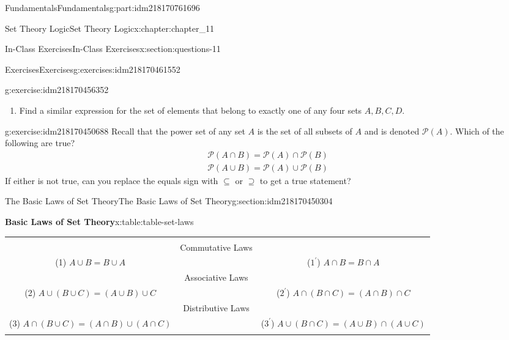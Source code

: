 \documentclass[oneside,10pt,]{book}
\newcommand{\tabularfont}{\relax}
\numberwithin{equation}{section}
\newcommand{\hrulethin}  {\noalign{\hrule height 0.04em}}
\begin{document}
\begin{partptx}{Fundamentals}{}{Fundamentals}{}{}{g:part:idm218170761696}
\begin{chapterptx}{Set Theory Logic}{}{Set Theory Logic}{}{}{x:chapter:chapter_11}
\begin{sectionptx}{In-Class Exercises}{}{In-Class Exercises}{}{}{x:section:questions-11}
\begin{exercises-subsection-numberless}{Exercises}{}{Exercises}{}{}{g:exercises:idm218170461552}
\begin{exercisegroup}
\begin{divisionexerciseeg}{2}{}{}{g:exercise:idm218170456352}
\begin{enumerate}[label=(\alph*)]
\begin{equation*}
(A \cup B \cup C)\cap ((A^c \cap B^c)\cup (A^c \cap C^c)\cup (B^c \cap C^c))
\end{equation*}
is the set of all elements that belong to exactly one of the three sets.  Verify this fact first with the example in the previous part, where you assume that the universe is \(\{1,2,3,\dots,18,19\}\).%
\item{}Find a similar expression for the set of elements that belong to exactly one of any four sets \(A, B, C, D.\)%
\end{enumerate}
%
\end{divisionexerciseeg}%
\begin{divisionexerciseeg}{3}{}{}{g:exercise:idm218170450688}%
Recall that the power set of any set \(A\) is the set of all subsets of \(A\) and is denoted \(\mathcal{P}(A)\).  Which of the following are true?%
\begin{gather*}
\mathcal{P}(A \cap B) = \mathcal{P}(A) \cap \mathcal{P}(B)\\
\mathcal{P}(A \cup B) = \mathcal{P}(A) \cup \mathcal{P}(B)
\end{gather*}
If either is not true, can you replace the equals sign with \(\subseteq\) or \(\supseteq\) to get a true statement?%
\end{divisionexerciseeg}%
\end{exercisegroup}
\par\medskip\noindent
\end{exercises-subsection-numberless}
\end{sectionptx}
%
%
\typeout{************************************************}
\typeout{************************************************}
%
\begin{sectionptx}{The Basic Laws of Set Theory}{}{The Basic Laws of Set Theory}{}{}{g:section:idm218170450304}
\begin{tableptx}{\textbf{Basic Laws of Set Theory}}{x:table:table-set-laws}{}%
\centering%
{\tabularfont%
\begin{tabular}{ccc}
&&\tabularnewline[0pt]
&Commutative Laws&\tabularnewline[0pt]
(1) \(A \cup B = B \cup  A\)&&(\(1^{\prime}\)) \(A \cap B = B\cap A\)\tabularnewline\hrulethin
&Associative Laws&\tabularnewline[0pt]
(2) \(A \cup  (B \cup  C)= (A\cup B)\cup C\)&&(\(2^{\prime}\)) \(A \cap  (B \cap  C) = (A \cap  B) \cap  C \)\tabularnewline\hrulethin
&Distributive Laws&\tabularnewline[0pt]
(3) \(A\cap (B \cup  C)=(A\cap B )\cup (A\cap  C)\)&&(\(3^{\prime}\)) \(A \cup (B \cap C) = (A \cup B ) \cap (A\cup C)\)\tabularnewline\hrulethin

\end{tabular}}
\end{tableptx}
\end{sectionptx}
\end{chapterptx}
\end{partptx}
\end{document}
